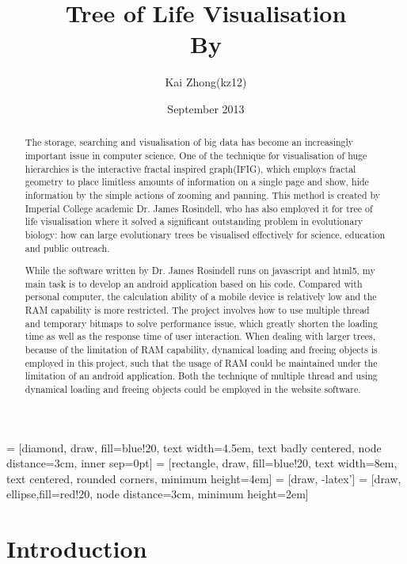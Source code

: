 \documentclass[MSc]{icldt}
\title{Tree of Life Visualisation \\ By}
\author{Kai Zhong(kz12)}
\date{September 2013}
\begin{document}
\maketitle

 = [diamond, draw, fill=blue!20, 
    text width=4.5em, text badly centered, node distance=3cm, inner sep=0pt]
 = [rectangle, draw, fill=blue!20, 
    text width=8em, text centered, rounded corners, minimum height=4em]
 = [draw, -latex']
 = [draw, ellipse,fill=red!20, node distance=3cm,
    minimum height=2em]
    
\begin{abstract}

The storage, searching and visualisation of big data has become an increasingly important issue in computer science. One of the technique for visualisation of huge hierarchies is the interactive fractal inspired graph(IFIG), which employs fractal geometry to place limitless amounts of information on a single page and show, hide information by the simple actions of zooming and panning. This method is created by Imperial College academic Dr. James Rosindell, who has also employed it for tree of life visualisation where it solved a significant outstanding problem in evolutionary biology: how can large evolutionary trees be visualised effectively for science, education and public outreach.

While the software written by Dr. James Rosindell runs on javascript and html5, my main task is to develop an android application based on his code. Compared with personal computer, the calculation ability of a mobile device is relatively low and the RAM capability is more restricted. The project involves how to use multiple thread and temporary bitmaps to solve performance issue, which greatly shorten the loading time as well as the response time of user interaction. When dealing with larger trees, because of the limitation of RAM capability, dynamical loading and freeing objects is employed in this project, such that the usage of RAM could be maintained under the limitation of an android application. 
Both the technique of multiple thread and using dynamical loading and freeing objects could be employed in the website software.

\end{abstract}

\makededication

\tableofcontents
\listoftables
\listoffigures

\chapter{Introduction}
\end{document}

